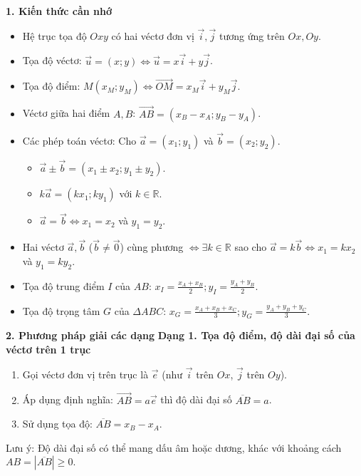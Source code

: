 \textbf{1. Kiến thức cần nhớ}
\begin{itemize}
\item Hệ trục tọa độ $Oxy$ có hai véctơ đơn vị $\overrightarrow{i}, \overrightarrow{j}$ tương ứng trên $Ox, Oy$.
\item Tọa độ véctơ: $\overrightarrow{u} = (x;y) \Leftrightarrow \overrightarrow{u} = x\overrightarrow{i} + y\overrightarrow{j}$.
\item Tọa độ điểm: $M(x_M; y_M) \Leftrightarrow \overrightarrow{OM} = x_M\overrightarrow{i} + y_M\overrightarrow{j}$.
\item Véctơ giữa hai điểm $A, B$: $\overrightarrow{AB} = (x_B - x_A; y_B - y_A)$.
\item Các phép toán véctơ: Cho $\overrightarrow{a} = (x_1; y_1)$ và $\overrightarrow{b} = (x_2; y_2)$.
  \begin{itemize}
  \item $\overrightarrow{a} \pm \overrightarrow{b} = (x_1 \pm x_2; y_1 \pm y_2)$.
  \item $k\overrightarrow{a} = (kx_1; ky_1)$ với $k \in \mathbb{R}$.
  \item $\overrightarrow{a} = \overrightarrow{b} \Leftrightarrow x_1 = x_2$ và $y_1 = y_2$.
  \end{itemize}
\item Hai véctơ $\overrightarrow{a}, \overrightarrow{b}$ ($\overrightarrow{b} \neq \overrightarrow{0}$) cùng phương $\Leftrightarrow \exists k \in \mathbb{R}$ sao cho $\overrightarrow{a} = k\overrightarrow{b} \Leftrightarrow x_1 = k x_2$ và $y_1 = k y_2$.
\item Tọa độ trung điểm $I$ của $AB$: $\boxed{x_I = \frac{x_A + x_B}{2}; y_I = \frac{y_A + y_B}{2}}$.
\item Tọa độ trọng tâm $G$ của $\Delta ABC$: $\boxed{x_G = \frac{x_A + x_B + x_C}{3}; y_G = \frac{y_A + y_B + y_C}{3}}$.
\end{itemize}

\textbf{2. Phương pháp giải các dạng}
\textbf{Dạng 1. Tọa độ điểm, độ dài đại số của véctơ trên 1 trục}
\begin{enumerate}
\item Gọi véctơ đơn vị trên trục là $\overrightarrow{e}$ (như $\overrightarrow{i}$ trên $Ox$, $\overrightarrow{j}$ trên $Oy$).
\item Áp dụng định nghĩa: $\overrightarrow{AB} = a\overrightarrow{e}$ thì độ dài đại số $\overline{AB} = a$.
\item Sử dụng tọa độ: $\overline{AB} = x_B - x_A$.
\end{enumerate}
Lưu ý: Độ dài đại số có thể mang dấu âm hoặc dương, khác với khoảng cách $AB = |\overline{AB}| \ge 0$.


